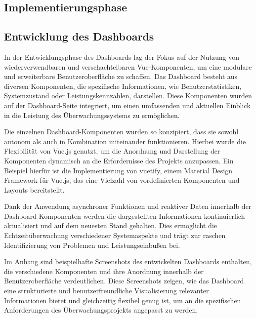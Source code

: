 \begin{flushleft}
	\section{Implementierungsphase}


	\subsection{Entwicklung des Dashboards}
	In der Entwicklungsphase des Dashboards lag der Fokus auf der Nutzung von wiederverwendbaren und verschachtelbaren Vue-Komponenten, um eine modulare und erweiterbare Benutzeroberfläche zu schaffen. Das Dashboard besteht aus diversen Komponenten, die spezifische Informationen, wie Benutzerstatistiken, Systemzustand oder Leistungskennzahlen, darstellen. Diese Komponenten wurden auf der Dashboard-Seite integriert, um einen umfassenden und aktuellen Einblick in die Leistung des Überwachungssystems zu ermöglichen.

	Die einzelnen Dashboard-Komponenten wurden so konzipiert, dass sie sowohl autonom als auch in Kombination miteinander funktionieren. Hierbei wurde die Flexibilität von Vue.js genutzt, um die Anordnung und Darstellung der Komponenten dynamisch an die Erfordernisse des Projekts anzupassen. Ein Beispiel hierfür ist die Implementierung von vuetify, einem Material Design Framework für Vue.js, das eine Vielzahl von vordefinierten Komponenten und Layouts bereitstellt.

	Dank der Anwendung asynchroner Funktionen und reaktiver Daten innerhalb der Dashboard-Komponenten werden die dargestellten Informationen kontinuierlich aktualisiert und auf dem neuesten Stand gehalten. Dies ermöglicht die Echtzeitüberwachung verschiedener Systemaspekte und trägt zur raschen Identifizierung von Problemen und Leistungseinbußen bei.

	Im Anhang sind beispielhafte Screenshots des entwickelten Dashboards enthalten, die verschiedene Komponenten und ihre Anordnung innerhalb der Benutzeroberfläche verdeutlichen. Diese Screenshots zeigen, wie das Dashboard eine strukturierte und benutzerfreundliche Visualisierung relevanter Informationen bietet und gleichzeitig flexibel genug ist, um an die spezifischen Anforderungen des Überwachungsprojekts angepasst zu werden.


\end{flushleft}

